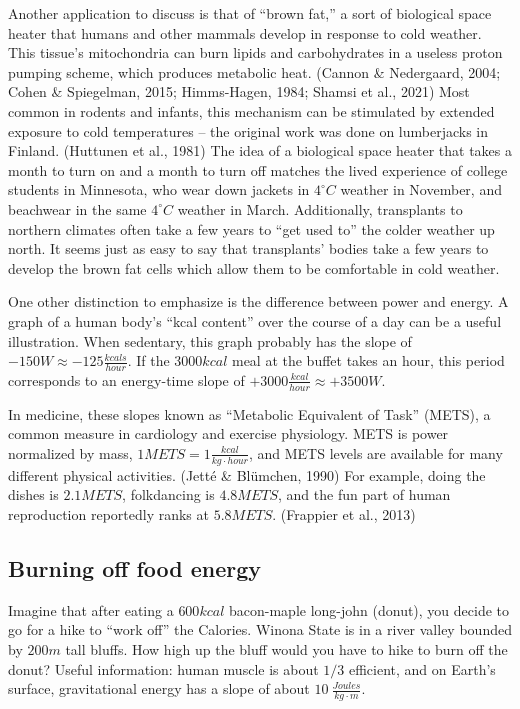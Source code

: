 \documentclass[11pt,letter]{article}
\newcommand{\degC}{^{\circ}C}
\begin{document}
Another application to discuss is that of ``brown fat,'' a sort of biological space heater that humans and other mammals develop in response to cold weather.  This tissue's mitochondria can burn lipids and carbohydrates in a useless proton pumping scheme, which produces metabolic heat. (Cannon \& Nedergaard, 2004;
Cohen \& Spiegelman, 2015; 
Himms-Hagen, 1984;
Shamsi et al., 2021)
Most common in rodents and infants, this mechanism can be stimulated by extended exposure to cold temperatures -- the original work was done on lumberjacks in Finland.
(Huttunen et al., 1981)
The idea of a biological space heater that takes a month to turn on and a month to turn off matches the lived experience of college students in Minnesota, who wear down jackets in $4\degC$ weather in November, and beachwear in the same $4\degC$ weather in March.  Additionally, transplants to northern climates often take a few years to ``get used to'' the colder weather up north. It seems just as easy to say that transplants' bodies take a few years to develop the brown fat cells which allow them to be comfortable in cold weather.

One other distinction to emphasize is the difference between power and energy.  A graph of a human body's ``kcal content'' over the course of a day can be a useful illustration.  When sedentary, this graph probably has the slope of $-150W\approx -125 \frac{kcals}{hour}$.  If the $3000kcal$ meal at the buffet takes an hour, this period corresponds to an energy-time slope of 
$+3000\frac{kcal}{hour}\approx +3500W$.  

In medicine, these slopes known as ``Metabolic Equivalent of Task'' (METS), a common measure in cardiology and exercise physiology.  METS is power normalized by mass, $1METS=1\frac{kcal}{kg\cdot hour}$, and METS levels are available for many different physical activities. (Jetté \& Blümchen, 1990) For example, doing the dishes is $2.1METS$, folkdancing is $4.8METS$, and the fun part of human reproduction reportedly ranks at $5.8METS$. (Frappier et al., 2013)

\subsection{Burning off food energy}
Imagine that after eating a $600kcal$ bacon-maple long-john (donut), you decide to go for a hike to ``work off'' the Calories.  
Winona State  is in a river valley bounded by $200m$ tall bluffs.  How high up the bluff would you have to hike to burn off the donut?  
Useful information: human muscle is about $1/3$ efficient, and on Earth's surface, gravitational energy has a slope of about $10~\frac{Joules}{kg\cdot m}$.
\end{document}
